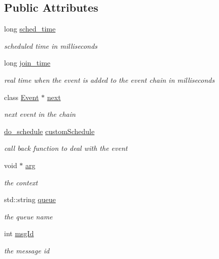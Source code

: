 \subsection*{\-Public \-Attributes}
\begin{DoxyCompactItemize}
\item 
long \hyperlink{classEvent_af44247209b624738228d66efe4a5eb36}{sched\-\_\-time}
\begin{DoxyCompactList}\small\item\em scheduled time in milliseconds \end{DoxyCompactList}\item 
long \hyperlink{classEvent_a585aca2566e1db426a025ea97b55a74a}{join\-\_\-time}
\begin{DoxyCompactList}\small\item\em real time when the event is added to the event chain in milliseconds \end{DoxyCompactList}\item 
class \hyperlink{classEvent}{\-Event} $\ast$ \hyperlink{classEvent_a88dc0fa91acbfbcfb1d2014491630d39}{next}
\begin{DoxyCompactList}\small\item\em next event in the chain \end{DoxyCompactList}\item 
\hyperlink{classEvent_a8e493c850490cee46d90c553eec37a1c}{do\-\_\-schedule} \hyperlink{classEvent_acccade40f77a128deeddfebb3c560d20}{custom\-Schedule}
\begin{DoxyCompactList}\small\item\em call back function to deal with the event \end{DoxyCompactList}\item 
void $\ast$ \hyperlink{classEvent_ae7c4ba85ebe5cb4c29ba9659c475f269}{arg}
\begin{DoxyCompactList}\small\item\em the context \end{DoxyCompactList}\item 
std\-::string \hyperlink{classEvent_acaeeb3bd2c79b564a896c18f0188c264}{queue}
\begin{DoxyCompactList}\small\item\em the queue name \end{DoxyCompactList}\item 
int \hyperlink{classEvent_af7d83ab02ea78a76a229d077a701ed5d}{msg\-Id}
\begin{DoxyCompactList}\small\item\em the message id \end{DoxyCompactList}\end{DoxyCompactItemize}


